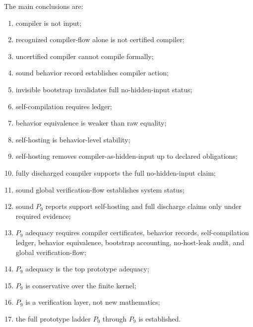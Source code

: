 The main conclusions are:
\begin{enumerate}
\item compiler is not input;
\item recognized compiler-flow alone is not certified compiler;
\item uncertified compiler cannot compile formally;
\item sound behavior record establishes compiler action;
\item invisible bootstrap invalidates full no-hidden-input status;
\item self-compilation requires ledger;
\item behavior equivalence is weaker than raw equality;
\item self-hosting is behavior-level stability;
\item self-hosting removes compiler-as-hidden-input up to declared obligations;
\item fully discharged compiler supports the full no-hidden-input claim;
\item sound global verification-flow establishes system status;
\item sound $P_9$ reports support self-hosting and full discharge claims only under required evidence;
\item $P_9$ adequacy requires compiler certificates, behavior records, self-compilation ledger, behavior equivalence, bootstrap accounting, no-host-leak audit, and global verification-flow;
\item $P_9$ adequacy is the top prototype adequacy;
\item $P_9$ is conservative over the finite kernel;
\item $P_9$ is a verification layer, not new mathematics;
\item the full prototype ladder $P_0$ through $P_9$ is established.
\end{enumerate}
